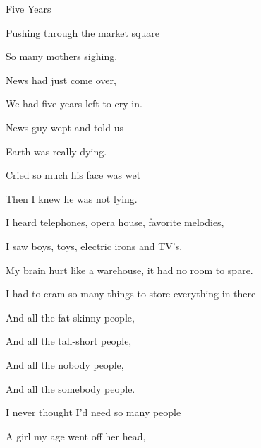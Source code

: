 \begin{song}{Five Years}{
	
	\chordset[Verse]{ \GMaj \Em \AMaj \CMajBassG }

	\chordset[Bridge]{ \Am \CMajBassG \GMaj \DSeven}
	
}

\begin{songverse}

Pushing through the market square

So many mothers sighing.

News had just come over,

We had five years left to cry in.


News guy wept and told us 

Earth was really dying.

Cried so much his face was wet

Then I knew he was not lying.

\end{songverse}

\begin{songverse}

I heard telephones, opera house, favorite melodies,

I saw boys, toys, electric irons and TV's.

My brain hurt like a warehouse, it had no room to spare.               
 
I had to cram so many things to store everything in there

\end{songverse}

\begin{songverse}

And all the fat-skinny \mbox{people, \quad {}}

And all the tall-short people,\quad {}

And all the nobody people, \quad {}
                      
And all the somebody people.

I never thought I'd need so many people \quad {}

\end{songverse}

\begin{songverse}                                 
 A girl my age went off her head,
 

\end{songverse}
\end{song}
